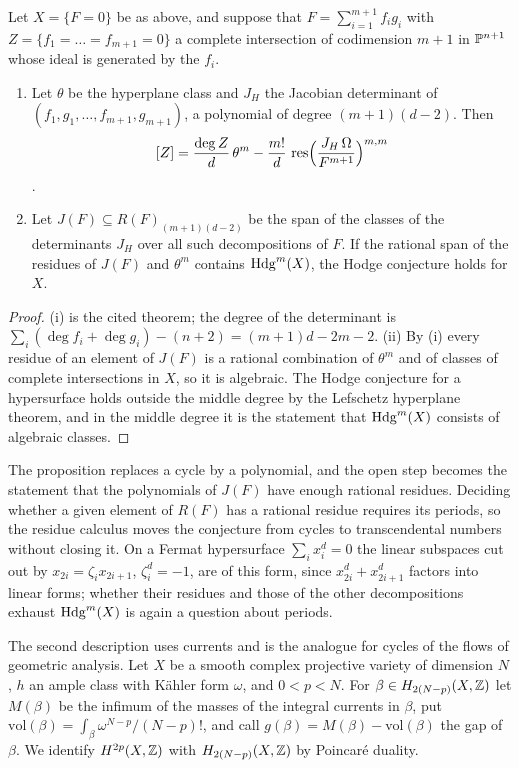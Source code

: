 \begin{proposition}\label{prop:residues}
Let $X=\{F=0\}$ be as above, and suppose that $F=\sum_{i=1}^{m+1}f_{i}g_{i}$ with $Z=\{f_{1}=\dots=f_{m+1}=0\}$ a complete intersection of codimension $m+1$ in $\mathbb{P}^{n+1}$ whose ideal is generated by the $f_{i}$.
\begin{enumerate}[label=\textup{(\roman*)},leftmargin=2.4em,itemsep=2pt]
\item Let $\theta$ be the hyperplane class and $J_{H}$ the Jacobian determinant of $(f_{1},g_{1},\dots,f_{m+1},g_{m+1})$, a polynomial of degree $(m+1)(d-2)$. Then
\[
[Z]=\frac{\deg Z}{d}\,\theta^{m}-\frac{m!}{d}\,\operatorname{res}\Bigl(\frac{J_{H}\,\Omega}{F^{m+1}}\Bigr)^{m,m}
\]
\cite[Thm.~1.1]{VL22}.
\item Let $J(F)\subseteq R(F)_{(m+1)(d-2)}$ be the span of the classes of the determinants $J_{H}$ over all such decompositions of $F$. If the rational span of the residues of $J(F)$ and $\theta^{m}$ contains $\mathrm{Hdg}^{m}(X)$, the Hodge conjecture holds for $X$.
\end{enumerate}
\end{proposition}

\begin{proof}
(i) is the cited theorem; the degree of the determinant is $\sum_{i}(\deg f_{i}+\deg g_{i})-(n+2)=(m+1)d-2m-2$. (ii) By (i) every residue of an element of $J(F)$ is a rational combination of $\theta^{m}$ and of classes of complete intersections in $X$, so it is algebraic. The Hodge conjecture for a hypersurface holds outside the middle degree by the Lefschetz hyperplane theorem, and in the middle degree it is the statement that $\mathrm{Hdg}^{m}(X)$ consists of algebraic classes.
\end{proof}

The proposition replaces a cycle by a polynomial, and the open step becomes the statement that the polynomials of $J(F)$ have enough rational residues. Deciding whether a given element of $R(F)$ has a rational residue requires its periods, so the residue calculus moves the conjecture from cycles to transcendental numbers without closing it. On a Fermat hypersurface $\sum_{i}x_{i}^{d}=0$ the linear subspaces cut out by $x_{2i}=\zeta_{i}x_{2i+1}$, $\zeta_{i}^{d}=-1$, are of this form, since $x_{2i}^{d}+x_{2i+1}^{d}$ factors into linear forms; whether their residues and those of the other decompositions exhaust $\mathrm{Hdg}^{m}(X)$ is again a question about periods.

The second description uses currents and is the analogue for cycles of the flows of geometric analysis. Let $X$ be a smooth complex projective variety of dimension $N$, $h$ an ample class with K\"ahler form $\omega$, and $0<p<N$. For $\beta\in H_{2(N-p)}(X,\mathbb{Z})$ let $M(\beta)$ be the infimum of the masses of the integral currents in $\beta$, put $\mathrm{vol}(\beta)=\int_{\beta}\omega^{N-p}/(N-p)!$, and call $g(\beta)=M(\beta)-\mathrm{vol}(\beta)$ the gap of $\beta$. We identify $H^{2p}(X,\mathbb{Z})$ with $H_{2(N-p)}(X,\mathbb{Z})$ by Poincar\'e duality.

